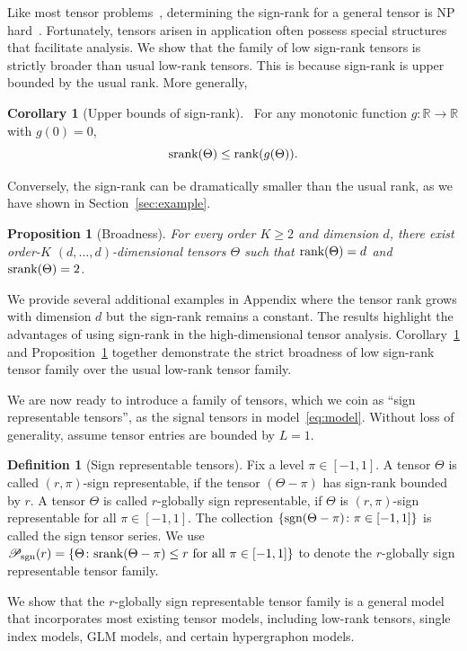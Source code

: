 \documentclass{article}
\theoremstyle{plain}
\newtheorem{prop}{Proposition}
\theoremstyle{definition}
\newtheorem{defn}{Definition}
\newtheorem{cor}{Corollary}
\def\sign{\textup{sgn}}
\def\srank{\textup{srank}}
\def\rank{\textup{rank}}
\def\caliP{\mathscr{P}_{\textup{sgn}}}
\begin{document}
Like most tensor problems~\cite{hillar2013most}, determining the sign-rank for a general tensor is NP hard~\cite{alon2016sign}. Fortunately, tensors arisen in application often possess special structures that facilitate analysis. We show that the family of low sign-rank tensors is strictly broader than usual low-rank tensors. This is because sign-rank is upper bounded by the usual rank. More generally, 
\begin{cor}[Upper bounds of sign-rank]~\label{cor:monotonic} For any monotonic function $g\colon \mathbb{R}\to \mathbb{R}$ with $g(0)=0$, 
\[
\textup{srank}(\Theta)\leq\rank(g(\Theta)).
\]
\end{cor}
Conversely, the sign-rank can be dramatically smaller than the usual rank, as we have shown in Section~\ref{sec:example}.
\begin{prop}[Broadness]\label{prop:extention}For every order $K\geq 2$ and dimension $d$, there exist order-$K$ $(d,\ldots,d)$-dimensional tensors $\Theta$ such that $\rank(\Theta)=d$ and $\srank(\Theta)=2$.
\end{prop}
We provide several additional examples in Appendix where the tensor rank grows with dimension $d$ but the sign-rank remains a constant. The results highlight the advantages of using sign-rank in the high-dimensional tensor analysis. Corollary~\ref{cor:monotonic} and Proposition~\ref{prop:extention} together demonstrate the strict broadness of low sign-rank tensor family over the usual low-rank tensor family. 

We are now ready to introduce a family of tensors, which we coin as ``sign representable tensors'', as the signal tensors in model~\eqref{eq:model}. 
Without loss of generality, assume tensor entries are bounded by $L=1$. 
\begin{defn}[Sign representable tensors] 
Fix a level $\pi\in[-1,1]$. A tensor $\Theta$ is called $(r,\pi)$-sign representable, if the tensor $(\Theta-\pi)$ has sign-rank bounded by $r$. A tensor $\Theta$ is called $r$-globally sign representable, if $\Theta$ is $(r,\pi)$-sign representable for all $\pi\in[-1,1]$. The collection $\{\sign(\Theta-\pi)\colon \pi \in[-1,1]\}$ is called the sign tensor series. 
We use $\caliP(r)=\{\Theta\colon \srank(\Theta-\pi)\leq r \text{ for all }\pi\in[-1,1]\}$ to denote the $r$-globally sign representable tensor family.
\end{defn}
We show that the $r$-globally sign representable tensor family is a general model that incorporates most existing tensor models, including low-rank tensors, single index models, GLM models, and certain hypergraphon models. 
\end{document}
